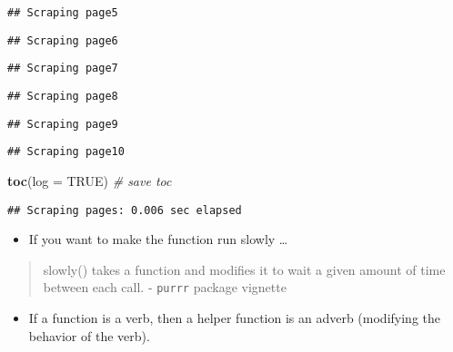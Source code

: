 \documentclass[
]{book}
\newenvironment{Shaded}{\begin{snugshade}}{\end{snugshade}}
\newcommand{\CommentTok}[1]{\textcolor[rgb]{0.56,0.35,0.01}{\textit{#1}}}
\newcommand{\DataTypeTok}[1]{\textcolor[rgb]{0.13,0.29,0.53}{#1}}
\newcommand{\KeywordTok}[1]{\textcolor[rgb]{0.13,0.29,0.53}{\textbf{#1}}}
\newcommand{\NormalTok}[1]{#1}
\newcommand{\OtherTok}[1]{\textcolor[rgb]{0.56,0.35,0.01}{#1}}
\providecommand{\tightlist}{%
  \setlength{\itemsep}{0pt}\setlength{\parskip}{0pt}}
\begin{document}
\begin{verbatim}
## Scraping page5
\end{verbatim}

\begin{verbatim}
## Scraping page6
\end{verbatim}

\begin{verbatim}
## Scraping page7
\end{verbatim}

\begin{verbatim}
## Scraping page8
\end{verbatim}

\begin{verbatim}
## Scraping page9
\end{verbatim}

\begin{verbatim}
## Scraping page10
\end{verbatim}

\begin{Shaded}
\begin{Highlighting}[]
\KeywordTok{toc}\NormalTok{(}\DataTypeTok{log =} \OtherTok{TRUE}\NormalTok{) }\CommentTok{\# save toc }
\end{Highlighting}
\end{Shaded}

\begin{verbatim}
## Scraping pages: 0.006 sec elapsed
\end{verbatim}

\begin{itemize}
\tightlist
\item
  If you want to make the function run slowly \ldots{}
\end{itemize}

\begin{quote}
slowly() takes a function and modifies it to wait a given amount of time between each call. - \texttt{purrr} package vignette
\end{quote}

\begin{itemize}
\tightlist
\item
  If a function is a verb, then a helper function is an adverb (modifying the behavior of the verb).
\end{itemize}
\end{document}

